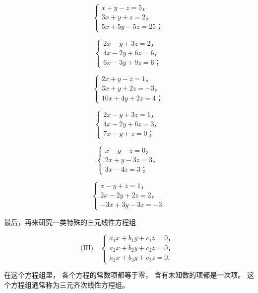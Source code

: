 \[
\left\{ \begin{array}{l} x + y - z = 5\text{，} \\ 3 x + y + z = 2\text{，} \\ 5 x + 5 y - 5 z = 25\text{；} \end{array} \right. \tag {1}
\]

\[
\left\{ \begin{array}{l} 2 x - y + 3 z = 2\text{，} \\ 4 x - 2 y + 6 z = 6\text{，} \\ 6 x - 3 y + 9 z = 6\text{；} \end{array} \right. \tag {3}
\]

\[
\left\{ \begin{array}{l} 2 x + y - z = 1\text{，} \\ 3 x + y + 2 z = - 3\text{，} \\ 10 x + 4 y + 2 z = 4\text{；} \end{array} \right. \tag {2}
\]

\[
\left\{ \begin{array}{l} 2 x - y + 3 z = 1\text{，} \\ 4 x - 2 y + 6 z = 3\text{，} \\ 7 x - y + z = 0\text{；} \end{array} \right. \tag {4}
\]

\[
\left\{ \begin{array}{l} x - y - z = 0\text{，} \\ 2 x + y - 3 z = 3\text{，} \\ 3 x - 4 z = 3\text{；} \end{array} \right. \tag {5}
\]

\[
\left\{ \begin{array}{l} x - y + z = 1\text{，} \\ 2 x - 2 y + 2 z = 2\text{，} \\ - 3 x + 3 y - 3 z = - 3. \end{array} \right. \tag {6}
\]

最后，再来研究一类特殊的三元线性方程组

\[
\text {(III)} \quad \left\{ \begin{array}{l} a _ {1} x + b _ {1} y + c _ {1} z = 0\text{，} \\ a _ {2} x + b _ {2} y + c _ {2} z = 0\text{，} \\ a _ {3} x + b _ {3} y + c _ {3} z = 0. \end{array} \right.
\]

在这个方程组里， 各个方程的常数项都等于零， 含有未知数的项都是一次项。
这个方程组通常称为三元齐次线性方程组。

